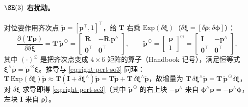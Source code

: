 \paragraph{$\SE(3)$ 右扰动。}对位姿作用齐次点 $\tilde{\mathbf{p}}=[\mathbf{p}^\top,1]^\top$，给 $\mathbf{T}$ 右乘 $\mathrm{Exp}(\delta\boldsymbol{\xi})$（$\delta\boldsymbol{\xi}=[\delta\boldsymbol{\rho};\delta\boldsymbol{\phi}]$）：
\begin{equation}
  \frac{\partial(\mathbf{T}\tilde{\mathbf{p}})}{\partial\delta\boldsymbol{\xi}}
  =\mathbf{T}\,\tilde{\mathbf{p}}^{\,\odot}
  =\begin{bmatrix}\mathbf{R}&-\mathbf{R}\,\mathbf{p}^\wedge\\\mathbf{0}^\top&\mathbf{0}^\top\end{bmatrix},
  \qquad
  \tilde{\mathbf{p}}^{\,\odot}=\begin{bmatrix}\mathbf{p}\\1\end{bmatrix}^{\!\odot}=\begin{bmatrix}\mathbf{I}&-\mathbf{p}^\wedge\\\mathbf{0}^\top&\mathbf{0}^\top\end{bmatrix},
  \label{eq:right-pert-se3}
\end{equation}
其中 $(\cdot)^\odot$ 是把齐次点变成 $4\times6$ 矩阵的算子（Handbook\cite{carlone2026handbook} 记号），满足恒等式 $\boldsymbol{\xi}^\wedge\tilde{\mathbf{p}}=\tilde{\mathbf{p}}^{\,\odot}\boldsymbol{\xi}$。推导与 \cref{eq:right-pert-so3} 同理：$\mathbf{T}\,\mathrm{Exp}(\delta\boldsymbol{\xi})\tilde{\mathbf{p}}\approx\mathbf{T}(\mathbf{I}+\delta\boldsymbol{\xi}^\wedge)\tilde{\mathbf{p}}=\mathbf{T}\tilde{\mathbf{p}}+\mathbf{T}\,\delta\boldsymbol{\xi}^\wedge\tilde{\mathbf{p}}$，故增量为 $\mathbf{T}\,\delta\boldsymbol{\xi}^\wedge\tilde{\mathbf{p}}=\mathbf{T}\,\tilde{\mathbf{p}}^{\,\odot}\delta\boldsymbol{\xi}$，对 $\delta\boldsymbol{\xi}$ 求导即得 \cref{eq:right-pert-se3}（其中 $\tilde{\mathbf{p}}^{\,\odot}$ 的右上块 $-\mathbf{p}^\wedge$ 来自 $\boldsymbol{\phi}^\wedge\mathbf{p}=-\mathbf{p}^\wedge\boldsymbol{\phi}$，左块 $\mathbf{I}$ 来自 $\boldsymbol{\rho}$）。

